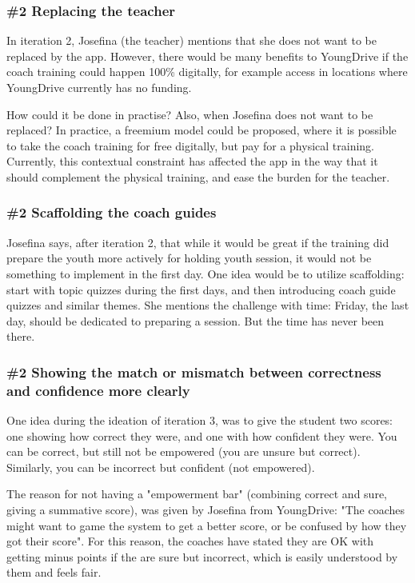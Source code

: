 \subsubsection{\#2 Replacing the teacher}
In iteration 2, Josefina (the teacher) mentions that she does not want to be replaced by the app. However, there would be many benefits to YoungDrive if the coach training could happen 100\% digitally, for example access in locations where YoungDrive currently has no funding.

How could it be done in practise? Also, when Josefina does not want to be replaced? In practice, a freemium model could be proposed, where it is possible to take the coach training for free digitally, but pay for a physical training. Currently, this contextual constraint has affected the app in the way that it should complement the physical training, and ease the burden for the teacher.

\subsubsection{\#2 Scaffolding the coach guides}
Josefina says, after iteration 2, that while it would be great if the training did prepare the youth more actively for holding youth session, it would not be something to implement in the first day. One idea would be to utilize scaffolding: start with topic quizzes during the first days, and then introducing coach guide quizzes and similar themes. She mentions the challenge with time: Friday, the last day, should be dedicated to preparing a session. But the time has never been there.

\subsubsection{\#2 Showing the match or mismatch between correctness and confidence more clearly}


One idea during the ideation of iteration 3, was to give the student two scores: one showing how correct they were, and one with how confident they were. You can be correct, but still not be empowered (you are unsure but correct). Similarly, you can be incorrect but confident (not empowered).

The reason for not having a "empowerment bar" (combining correct and sure, giving a summative score), was given by Josefina from YoungDrive: "The coaches might want to game the system to get a better score, or be confused by how they got their score". For this reason, the coaches have stated they are OK with getting minus points if the are sure but incorrect, which is easily understood by them and feels fair.

